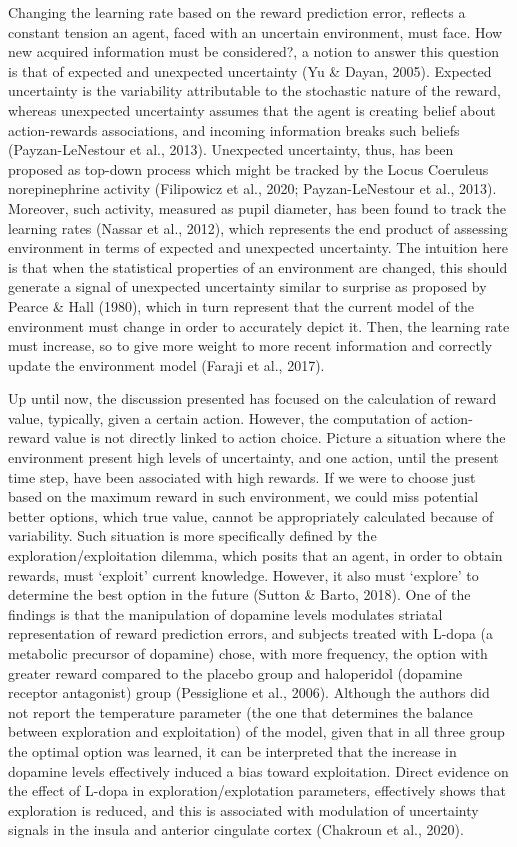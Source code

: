\documentclass[
]{/home/nicoluarte/Downloads/templates/PNAS-template-main.tex}
\begin{document}
Changing the learning rate based on the reward prediction error,
reflects a constant tension an agent, faced with an uncertain
environment, must face. How new acquired information must be
considered?, a notion to answer this question is that of expected and
unexpected uncertainty (Yu \& Dayan, 2005). Expected uncertainty is the
variability attributable to the stochastic nature of the reward, whereas
unexpected uncertainty assumes that the agent is creating belief about
action-rewards associations, and incoming information breaks such
beliefs (Payzan-LeNestour et al., 2013). Unexpected uncertainty, thus,
has been proposed as top-down process which might be tracked by the
Locus Coeruleus norepinephrine activity (Filipowicz et al., 2020;
Payzan-LeNestour et al., 2013). Moreover, such activity, measured as
pupil diameter, has been found to track the learning rates (Nassar et
al., 2012), which represents the end product of assessing environment in
terms of expected and unexpected uncertainty. The intuition here is that
when the statistical properties of an environment are changed, this
should generate a signal of unexpected uncertainty similar to surprise
as proposed by Pearce \& Hall (1980), which in turn represent that the
current model of the environment must change in order to accurately
depict it. Then, the learning rate must increase, so to give more weight
to more recent information and correctly update the environment model
(Faraji et al., 2017).

Up until now, the discussion presented has focused on the calculation of
reward value, typically, given a certain action. However, the
computation of action-reward value is not directly linked to action
choice. Picture a situation where the environment present high levels of
uncertainty, and one action, until the present time step, have been
associated with high rewards. If we were to choose just based on the
maximum reward in such environment, we could miss potential better
options, which true value, cannot be appropriately calculated because of
variability. Such situation is more specifically defined by the
exploration/exploitation dilemma, which posits that an agent, in order
to obtain rewards, must `exploit' current knowledge. However, it also
must `explore' to determine the best option in the future (Sutton \&
Barto, 2018). One of the findings is that the manipulation of dopamine
levels modulates striatal representation of reward prediction errors,
and subjects treated with L-dopa (a metabolic precursor of dopamine)
chose, with more frequency, the option with greater reward compared to
the placebo group and haloperidol (dopamine receptor antagonist) group
(Pessiglione et al., 2006). Although the authors did not report the
temperature parameter (the one that determines the balance between
exploration and exploitation) of the model, given that in all three
group the optimal option was learned, it can be interpreted that the
increase in dopamine levels effectively induced a bias toward
exploitation. Direct evidence on the effect of L-dopa in
exploration/explotation parameters, effectively shows that exploration
is reduced, and this is associated with modulation of uncertainty
signals in the insula and anterior cingulate cortex (Chakroun et al.,
2020).
\end{document}
